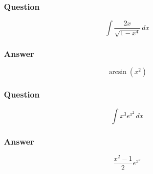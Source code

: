 \documentclass[12pt, t]{beamer}
\begin{document}
\begin{frame}
    \frametitle{Question}
    \vfill 
    \begin{Large}
        \begin{equation*}
            \int \frac{2x}{\sqrt{1 - x^4}}\,dx
        \end{equation*}
    \end{Large}
    \vfill
\end{frame}

\begin{frame}
    \frametitle{Answer}
    \vfill
    \begin{Large}
        \begin{equation*}
            \arcsin (x^2)
        \end{equation*}
    \end{Large}
    \vfill
\end{frame}

\begin{frame}
    \frametitle{Question}
    \vfill
    \begin{Large}
        \begin{equation*}
            \int x^3 e^{x^2}\,dx
        \end{equation*}    
    \end{Large}
    \vfill
\end{frame}

\begin{frame}
    \frametitle{Answer}
    \vfill
    \begin{Large}
        \begin{equation*}
            \frac{x^2 - 1}{2}e^{x^2}
        \end{equation*}    
    \end{Large}
    \vfill
\end{frame}
\end{document}
